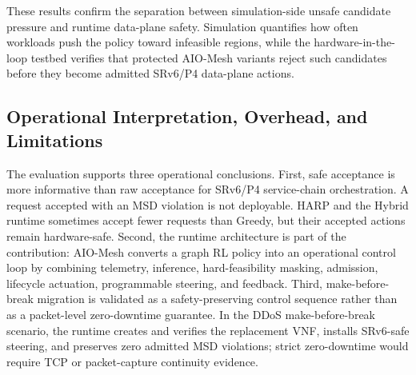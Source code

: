\documentclass[final,5p]{elsarticle}
\begin{document}
\begin{table}[t]
\centering
\caption{Hardware-in-the-loop testbed results: acceptance rate / admitted MSD violation rate.}
\label{tab:testbed_results}
\renewcommand{\arraystretch}{1.08}
\setlength{\tabcolsep}{2pt}
\scriptsize
{}
\end{table}

These results confirm the separation between simulation-side unsafe candidate pressure and runtime data-plane safety. Simulation quantifies how often workloads push the policy toward infeasible regions, while the hardware-in-the-loop testbed verifies that protected AIO-Mesh variants reject such candidates before they become admitted SRv6/P4 data-plane actions.

\subsection{Operational Interpretation, Overhead, and Limitations}
\label{subsec:operational_interpretation}

The evaluation supports three operational conclusions. First, safe acceptance is more informative than raw acceptance for SRv6/P4 service-chain orchestration. A request accepted with an MSD violation is not deployable. HARP and the Hybrid runtime sometimes accept fewer requests than Greedy, but their accepted actions remain hardware-safe. Second, the runtime architecture is part of the contribution: AIO-Mesh converts a graph RL policy into an operational control loop by combining telemetry, inference, hard-feasibility masking, admission, lifecycle actuation, programmable steering, and feedback. Third, make-before-break migration is validated as a safety-preserving control sequence rather than as a packet-level zero-downtime guarantee. In the DDoS make-before-break scenario, the runtime creates and verifies the replacement VNF, installs SRv6-safe steering, and preserves zero admitted MSD violations; strict zero-downtime would require TCP or packet-capture continuity evidence.
\end{document}

